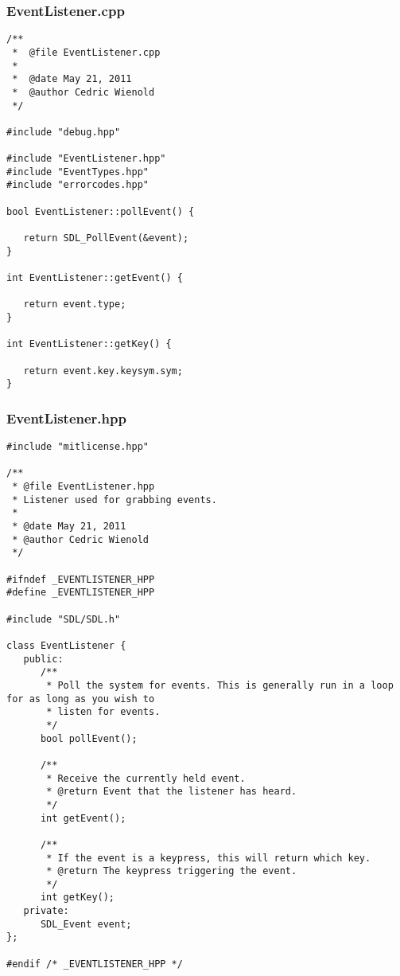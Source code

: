 \documentclass[12pt]{article}
\begin{document}
\subsubsection{EventListener.cpp}
\begin{lstlisting}[breaklines]
/**
 *  @file EventListener.cpp
 *
 *  @date May 21, 2011
 *  @author Cedric Wienold
 */

#include "debug.hpp"

#include "EventListener.hpp"
#include "EventTypes.hpp"
#include "errorcodes.hpp"

bool EventListener::pollEvent() {

   return SDL_PollEvent(&event);
}

int EventListener::getEvent() {

   return event.type;
}

int EventListener::getKey() {

   return event.key.keysym.sym;
}
\end{lstlisting}
\subsubsection{EventListener.hpp}
\begin{lstlisting}[breaklines]
#include "mitlicense.hpp"

/**
 * @file EventListener.hpp
 * Listener used for grabbing events.
 *
 * @date May 21, 2011
 * @author Cedric Wienold
 */

#ifndef _EVENTLISTENER_HPP
#define _EVENTLISTENER_HPP

#include "SDL/SDL.h"

class EventListener {
   public:
      /**
       * Poll the system for events. This is generally run in a loop for as long as you wish to
       * listen for events.
       */
      bool pollEvent();

      /**
       * Receive the currently held event.
       * @return Event that the listener has heard.
       */
      int getEvent();

      /**
       * If the event is a keypress, this will return which key.
       * @return The keypress triggering the event.
       */
      int getKey();
   private:
      SDL_Event event;
};

#endif /* _EVENTLISTENER_HPP */
\end{lstlisting}
\end{document}

